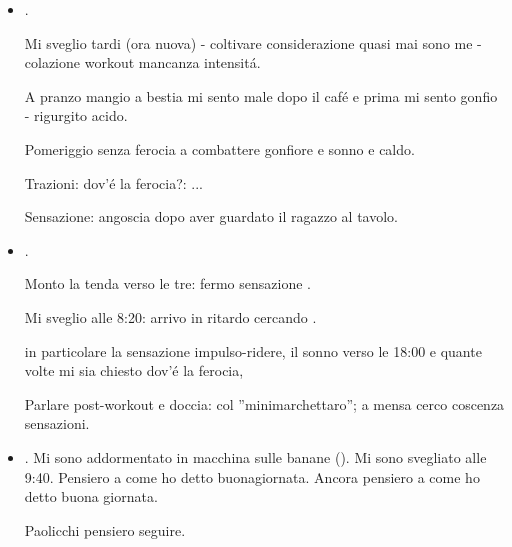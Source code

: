 \begin{itemize}
Primo pomeriggio nello stanzino caf\'e al Paci: confusione ascoltare .

Primo utilizzo carta socio unifi: angoscia-.

Coscenza \sout{rabbia barcollante} vs .

Angoscia orgia - angoscia interazione interlocutore (avvertire di chiudere la porta) - -chiususra.

Lotta osservarmi come dall'esterno (me in-se) .

Stare al gioco prendendo la parte peggiore.

\item {}.

Mi sveglio tardi (ora nuova) - coltivare considerazione quasi mai sono me - colazione workout  mancanza intensit\'a.

A pranzo mangio a bestia mi sento male dopo il caf\'e e prima mi sento gonfio - rigurgito acido.

Pomeriggio senza ferocia a combattere gonfiore e sonno e caldo.

Trazioni: dov'\'e la ferocia?: ...

Sensazione: angoscia dopo aver guardato il ragazzo al tavolo.

\item {}.

Monto la tenda verso le tre: fermo  sensazione .

Mi sveglio alle 8:20: arrivo in ritardo cercando .

 in particolare la sensazione impulso-ridere, il sonno verso le 18:00 e quante volte mi sia chiesto dov'\'e la ferocia,

Parlare post-workout e doccia:  col ''minimarchettaro''; a mensa cerco coscenza sensazioni.

\item {}. Mi sono addormentato in macchina sulle banane (). Mi sono svegliato alle 9:40. Pensiero a come ho detto buonagiornata. Ancora pensiero a come ho detto buona giornata.

Paolicchi pensiero seguire.


\end{itemize}
